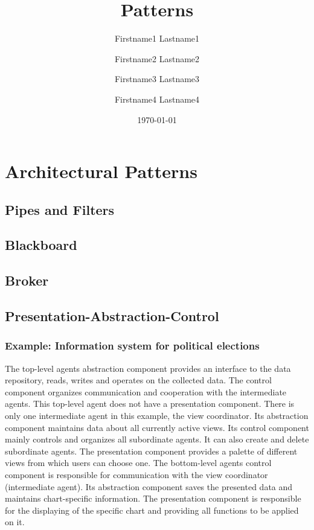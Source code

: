 \documentclass{scrbook}
\title{Patterns}
\author{Firstname1 Lastname1 \and Firstname2 Lastname2 \and Firstname3
Lastname3 \and Firstname4 Lastname4}
\date{\today}
\begin{document}
\frontmatter
\maketitle
\tableofcontents
\mainmatter
\part{Architectural Patterns}
\chapter{Pipes and Filters}
\chapter{Blackboard}
\chapter{Broker}

\chapter{Presentation-Abstraction-Control}


\section{Example: Information system for political elections}	%



The top-level agents abstraction component provides an interface to the data repository, reads, writes and operates on the collected data. The control component organizes communication and cooperation with the intermediate agents. This top-level agent does not have a presentation component. 
There is only one intermediate agent in this example, the view coordinator. Its abstraction component maintains data about all currently active views. Its control component mainly controls and organizes all subordinate agents. It can also create and delete subordinate agents. The presentation component provides a palette of different views from which users can choose one. 
The bottom-level agents control component is responsible for communication with the view coordinator (intermediate agent). Its abstraction component saves the presented data and maintains chart-specific information. The presentation component is responsible for the displaying of the specific chart and providing all functions to be applied on it. 
\end{document}
